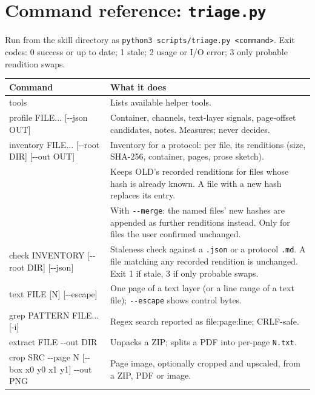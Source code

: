 \documentclass[11pt,a4paper]{article}
\newcommand{\file}[1]{\texttt{#1}}
\newcommand{\cmd}[1]{\texttt{#1}}
\begin{document}
\appendix
\section{Command reference: \file{triage.py}}

Run from the skill directory as \cmd{python3 scripts/triage.py <command>}.
Exit codes: 0 success or up to date; 1 stale; 2 usage or I/O error;
3 only probable rendition swaps.

\begin{center}
\small
\begin{tabularx}{\linewidth}{@{}>{\ttfamily}p{5.2cm}X@{}}
\toprule
\normalfont\textbf{Command} & \textbf{What it does} \\
\midrule
tools & Lists available helper tools. \\
profile FILE... [-{}-json OUT] & Container, channels, text-layer signals,
page-offset candidates, notes. Measures; never decides. \\
inventory FILE... [-{}-root DIR] [-{}-out OUT] & Inventory for a protocol:
per file, its renditions (size, SHA-256, container, pages, prose
sketch). \\
 & Keeps OLD's recorded renditions for files whose
hash is already known. A file with a new hash replaces its entry. \\
 & With \texttt{-{}-merge}: the named files'
new hashes are appended as further renditions instead. Only for files the
user confirmed unchanged. \\
check INVENTORY [-{}-root DIR] [-{}-json] & Staleness check against a
\file{.json} or a protocol \file{.md}. A file matching any recorded
rendition is unchanged. Exit 1 if stale, 3 if only probable swaps. \\
text FILE [N] [-{}-escape] & One page of a text layer (or a line range of
a text file); \texttt{-{}-escape} shows control bytes. \\
grep PATTERN FILE... [-i] & Regex search reported as file:page:line;
CRLF-safe. \\
extract FILE -{}-out DIR & Unpacks a ZIP; splits a PDF into per-page
\file{N.txt}. \\
crop SRC -{}-page N [-{}-box x0 y0 x1 y1] -{}-out PNG & Page image,
optionally cropped and upscaled, from a ZIP, PDF or image. \\
\bottomrule
\end{tabularx}
\end{center}
\end{document}
